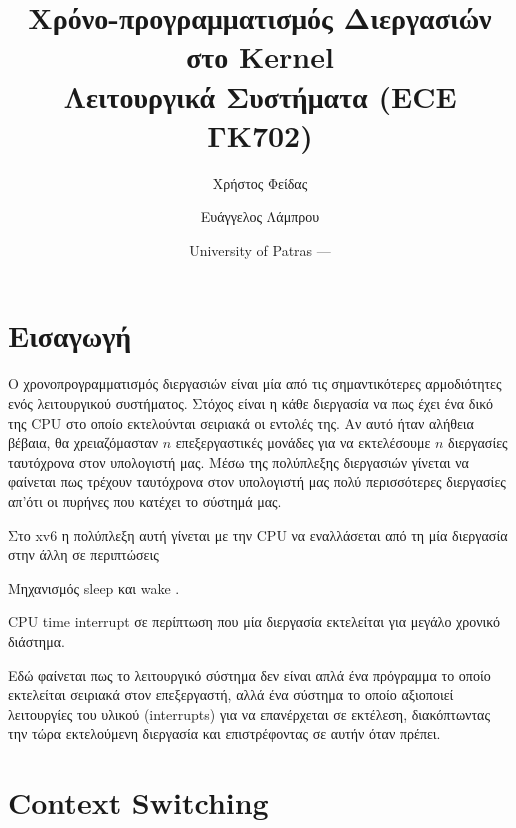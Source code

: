 \documentclass[18pt]{extarticle}
\title{Χρόνο-προγραμματισμός Διεργασιών στο \src{xv6} Kernel \\Λειτουργικά Συστήματα (ECE ΓΚ702)} %
\author{\footnotesize Χρήστος Φείδας\\ \footnotesize \src{fidas@upatras.gr} \and \footnotesize Ευάγγελος Λάμπρου\\ \footnotesize \src{e.lamprou@upnet.gr}} %
\date{University of Patras --- \the\year{}} %
\begin{document}
\pagestyle{fancy}
\fancyhf{} %
\renewcommand{\headrulewidth}{0pt}
\fancyhead{} %
\fancyfoot{} %
\fancyfoot[R]{\thepage}

\maketitle

\tableofcontents


\section{Εισαγωγή}

Ο χρονοπρογραμματισμός διεργασιών είναι μία από τις σημαντικότερες 
αρμοδιότητες ενός λειτουργικού συστήματος.
Στόχος είναι η κάθε διεργασία να  πως έχει ένα 
δικό της CPU στο οποίο εκτελούνται σειριακά οι εντολές της.
Αν αυτό ήταν αλήθεια βέβαια, θα χρειαζόμασταν $n$ επεξεργαστικές μονάδες 
για να εκτελέσουμε $n$ διεργασίες ταυτόχρονα στον υπολογιστή μας. 
Μέσω της πολύπλεξης διεργασιών γίνεται να φαίνεται πως τρέχουν ταυτόχρονα στον υπολογιστή μας
πολύ περισσότερες διεργασίες απ'ότι οι πυρήνες που κατέχει το σύστημά μας.

Στο xv6 η πολύπλεξη αυτή γίνεται με την CPU να εναλλάσεται από τη μία διεργασία
στην άλλη σε περιπτώσεις
\begin{enumerate*}
    \item Μηχανισμός sleep και wake \cite{OnlineSleepWake}.
    \item CPU time interrupt σε περίπτωση που μία διεργασία εκτελείται για μεγάλο χρονικό διάστημα.
\end{enumerate*}

Εδώ φαίνεται πως το λειτουργικό σύστημα δεν είναι απλά ένα πρόγραμμα το οποίο εκτελείται σειριακά στον επεξεργαστή, 
αλλά ένα σύστημα το οποίο αξιοποιεί λειτουργίες του υλικού (interrupts) για να επανέρχεται σε εκτέλεση, διακόπτωντας
την τώρα εκτελούμενη διεργασία και επιστρέφοντας σε αυτήν όταν πρέπει.

\section{Context Switching}
\end{document}

